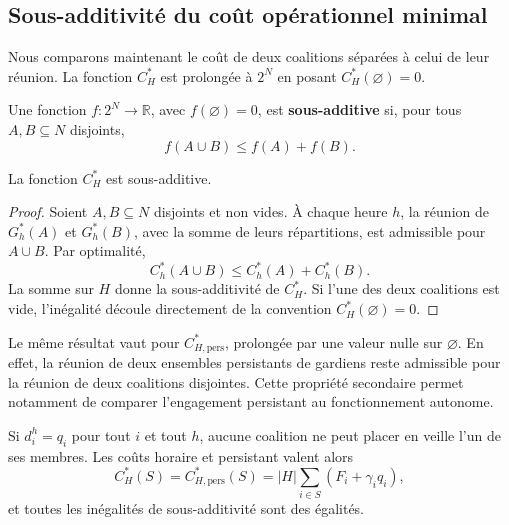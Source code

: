 \subsection{Sous-additivité du coût opérationnel minimal}

Nous comparons maintenant le coût de deux coalitions séparées à celui de leur
réunion. La fonction \(C_H^*\) est prolongée à \(2^N\) en posant
\(C_H^*(\varnothing)=0\).

\begin{definition}
Une fonction \(f:2^N\to\mathbb R\), avec \(f(\varnothing)=0\), est
\textbf{sous-additive} si, pour tous \(A,B\subseteq N\) disjoints,
\[
    f(A\cup B)\leqslant f(A)+f(B).
\]
\end{definition}

\begin{theorem}
\label{thm:sousadd}
La fonction \(C_H^*\) est sous-additive.
\end{theorem}

\begin{proof}
Soient \(A,B\subseteq N\) disjoints et non vides. À chaque heure \(h\), la
réunion de \(G_h^*(A)\) et \(G_h^*(B)\), avec la somme de leurs répartitions,
est admissible pour \(A\cup B\). Par optimalité,
\[
    C_h^*(A\cup B)\leqslant C_h^*(A)+C_h^*(B).
\]
La somme sur \(H\) donne la sous-additivité de \(C_H^*\).
Si l'une des deux coalitions est vide, l'inégalité découle directement de la
convention \(C_H^*(\varnothing)=0\).
\end{proof}

\begin{remarque}
Le même résultat vaut pour \(C_{H,\mathrm{pers}}^*\), prolongée par une valeur
nulle sur \(\varnothing\). En effet, la réunion de deux ensembles persistants
de gardiens reste admissible pour la réunion de deux coalitions disjointes.
Cette propriété secondaire permet notamment de comparer l'engagement
persistant au fonctionnement autonome.
\end{remarque}

\begin{remarque}
Si \(d_i^h=q_i\) pour tout \(i\) et tout \(h\), aucune coalition ne peut
placer en veille l'un de ses membres. Les coûts horaire et persistant valent
alors
\[
    C_H^*(S)=C_{H,\mathrm{pers}}^*(S)
    =|H|\sum_{i\in S}(F_i+\gamma_iq_i),
\]
et toutes les inégalités de sous-additivité sont des égalités.
\end{remarque}

